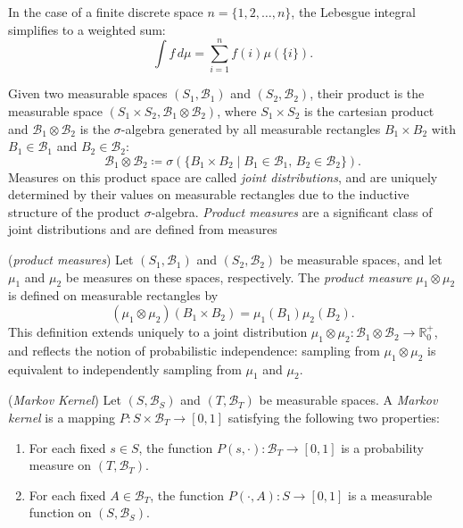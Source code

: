 In the case of a finite discrete space $n = \{1, 2, \dots, n\}$, the Lebesgue integral simplifies to a weighted sum:
$$
\int f \, d\mu = \sum_{i=1}^n f(i) \mu(\{i\}).
$$

Given two measurable spaces $(S_1, \mathcal{B}_1)$ and $(S_2, \mathcal{B}_2)$, their product is the measurable space $(S_1 \times S_2, \mathcal{B}_1 \otimes \mathcal{B}_2)$, where $S_1  \times S_2$ is the cartesian product and $\mathcal{B}_1 \otimes \mathcal{B}_2$ is the $\sigma$-algebra generated by all measurable rectangles $B_1 \times B_2$ with $B_1 \in \mathcal{B}_1$ and $B_2 \in \mathcal{B}_2$:
$$
\mathcal{B}_1 \otimes \mathcal{B}_2 \coloneqq \sigma\left(\{ B_1 \times B_2 \mid B_1 \in \mathcal{B}_1,\, B_2 \in \mathcal{B}_2 \}\right).
$$
Measures on this product space are called \emph{joint distributions}, and are uniquely determined by their values on measurable rectangles due to the inductive structure of the product $\sigma$-algebra. \emph{Product measures} are a significant class of joint distributions and are defined from measures

\begin{definition} (\emph{product measures})
   Let $(S_1, \mathcal{B}_1)$ and $(S_2, \mathcal{B}_2)$ be measurable spaces, and let $\mu_1$ and $\mu_2$ be measures on these spaces, respectively. The \emph{product measure} $\mu_1 \otimes \mu_2$ is  defined on measurable rectangles by
$$
(\mu_1 \otimes \mu_2)(B_1 \times B_2) = \mu_1(B_1)\mu_2(B_2).
$$
This definition extends uniquely to a joint distribution $\mu_1 \otimes \mu_2: \mathcal{B}_1 \otimes \mathcal{B}_2 \to \mathbb{R}_0^+$, and reflects the notion of probabilistic independence: sampling from $\mu_1 \otimes \mu_2$ is equivalent to independently sampling from $\mu_1$ and $\mu_2$.
\end{definition}


\begin{definition}(\emph{Markov Kernel})
Let $(S, \mathcal{B}_S)$ and $(T, \mathcal{B}_T)$ be measurable spaces. A \emph{Markov kernel} is a mapping $P : S \times \mathcal{B}_T \to [0,1]$
satisfying the following two properties:
\begin{enumerate}
    \item For each fixed $s \in S$, the function $P(s, \cdot) : \mathcal{B}_T \to [0,1]$ is a probability measure on $(T, \mathcal{B}_T)$.
    \item For each fixed $A \in \mathcal{B}_T$, the function $P(\cdot, A) : S \to [0,1]$ is a measurable function on $(S, \mathcal{B}_S)$.
\end{enumerate}
\end{definition}


